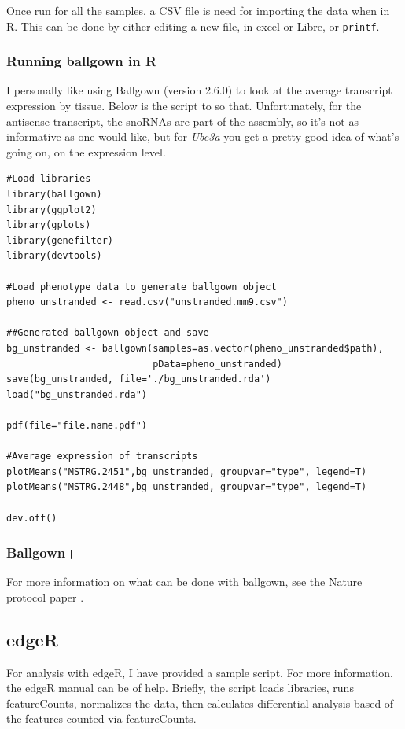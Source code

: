 Once run for all the samples, a CSV file is need for importing the data when in R. This can be done by either editing a new file, in excel or Libre, or \texttt{printf}.

\subsubsection*{Running ballgown in R}
I personally like using Ballgown \cite{Pertea2016,Fu2016} (version 2.6.0) to look at the average transcript expression by tissue. Below is the script to so that. Unfortunately, for the antisense transcript, the snoRNAs are part of the assembly, so it's not as informative as one would like, but for \textit{Ube3a} you get a pretty good idea of what's going on, on the expression level.
\begin{verbatim}
#Load libraries
library(ballgown)
library(ggplot2)
library(gplots)
library(genefilter)
library(devtools)

#Load phenotype data to generate ballgown object
pheno_unstranded <- read.csv("unstranded.mm9.csv")

##Generated ballgown object and save
bg_unstranded <- ballgown(samples=as.vector(pheno_unstranded$path),
                          pData=pheno_unstranded)
save(bg_unstranded, file='./bg_unstranded.rda')
load("bg_unstranded.rda")

pdf(file="file.name.pdf")

#Average expression of transcripts
plotMeans("MSTRG.2451",bg_unstranded, groupvar="type", legend=T)
plotMeans("MSTRG.2448",bg_unstranded, groupvar="type", legend=T)

dev.off()
\end{verbatim}

\subsubsection*{Ballgown+}
For more information on what can be done with ballgown, see the Nature protocol paper \cite{Pertea2016}.

\subsection{edgeR}
For analysis with edgeR, I have provided a sample script. For more information, the edgeR manual can be of help. Briefly, the script loads libraries, runs featureCounts, normalizes the data, then calculates differential analysis based of the features counted via featureCounts.

